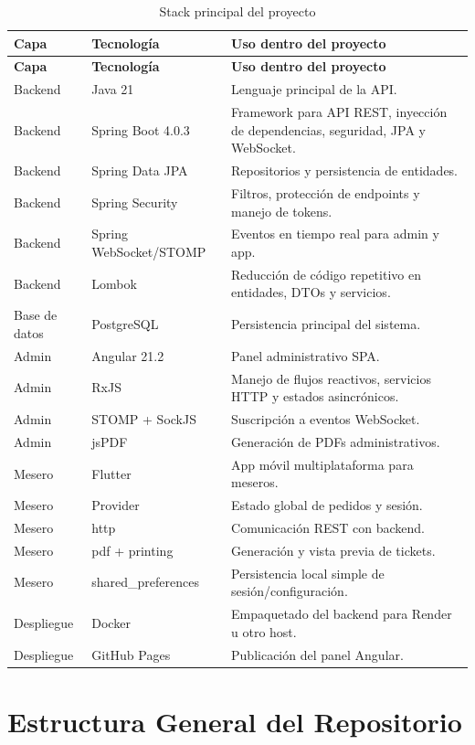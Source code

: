 \documentclass[11pt,letterpaper,openany]{report}
\begin{document}
\begin{longtable}{p{}p{}p{}}
\caption{Stack principal del proyecto}\\
\toprule
\textbf{Capa} & \textbf{Tecnología} & \textbf{Uso dentro del proyecto}\\
\midrule
\endfirsthead
\toprule
\textbf{Capa} & \textbf{Tecnología} & \textbf{Uso dentro del proyecto}\\
\midrule
\endhead
Backend & Java 21 & Lenguaje principal de la API.\\
Backend & Spring Boot 4.0.3 & Framework para API REST, inyección de dependencias, seguridad, JPA y WebSocket.\\
Backend & Spring Data JPA & Repositorios y persistencia de entidades.\\
Backend & Spring Security & Filtros, protección de endpoints y manejo de tokens.\\
Backend & Spring WebSocket/STOMP & Eventos en tiempo real para admin y app.\\
Backend & Lombok & Reducción de código repetitivo en entidades, DTOs y servicios.\\
Base de datos & PostgreSQL & Persistencia principal del sistema.\\
Admin & Angular 21.2 & Panel administrativo SPA.\\
Admin & RxJS & Manejo de flujos reactivos, servicios HTTP y estados asincrónicos.\\
Admin & STOMP + SockJS & Suscripción a eventos WebSocket.\\
Admin & jsPDF & Generación de PDFs administrativos.\\
Mesero & Flutter & App móvil multiplataforma para meseros.\\
Mesero & Provider & Estado global de pedidos y sesión.\\
Mesero & http & Comunicación REST con backend.\\
Mesero & pdf + printing & Generación y vista previa de tickets.\\
Mesero & shared\_preferences & Persistencia local simple de sesión/configuración.\\
Despliegue & Docker & Empaquetado del backend para Render u otro host.\\
Despliegue & GitHub Pages & Publicación del panel Angular.\\
\bottomrule
\end{longtable}

\section{Estructura General del Repositorio}
\end{document}
